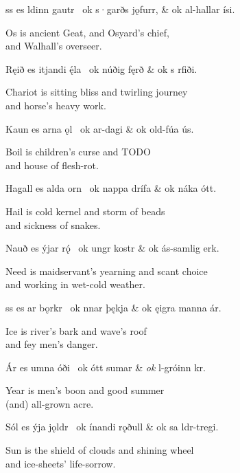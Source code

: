 \bvg\bva%
ss es ldinn gautr \hld\ ok s·garðs jǫfurr, &
\ind ok al-hallar ísi.\eva

\bvb Os is ancient Geat, and Osyard’s chief, \\
\ind and Walhall’s overseer.\evb\evg


\bvg\bva%
Ręið es itjandi ę́la \hld\ ok núðig fęrð &
\ind ok s rfiði.\eva

\bvb Chariot is sitting bliss and twirling journey \\
\ind and horse’s heavy work.\evb\evg


\bvg\bva%
Kaun es arna ǫl \hld\ ok ar-dagi &
\ind ok old-fúa ús.\eva

\bvb Boil is children’s curse and TODO \\
\ind and house of flesh-rot.\evb\evg


\bvg\bva%
Hagall es alda orn \hld\ ok nappa drífa &
\ind ok náka ótt.\eva

\bvb Hail is cold kernel and storm of beads \\
\ind and sickness of snakes.\evb\evg


\bvg\bva%
Nauð es ýjar rǫ́ \hld\ ok ungr kostr &
\ind ok ás-samlig erk.\eva

\bvb Need is maidservant’s yearning and scant choice \\
\ind and working in wet-cold weather.\evb\evg


\bvg\bva%
ss es ar bǫrkr \hld\ ok nnar þękja &
\ind ok ęigra manna ár.\eva

\bvb Ice is river’s bark and wave’s roof \\
\ind and fey men’s danger.\evb\evg


\bvg\bva%
Ár es umna óði \hld\ ok ótt sumar &
\ind \emph{ok} l-gróinn kr.\eva

\bvb Year is men’s boon and good summer \\
\ind (and) all-grown acre.\evb\evg


\bvg\bva%
Sól es ýja jǫldr \hld\ ok ínandi rǫðull &
\ind ok sa ldr-tregi.\eva

\bvb Sun is the shield of clouds and shining wheel \\
\ind and ice-sheets’ life-sorrow.\evb\evg


